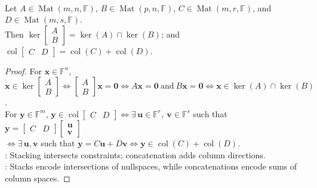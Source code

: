 \begin{proposition} \label{prop:stacked-nullspaces-and-concatenated-column-spaces} \\
Let $A\in\operatorname{Mat}(m,n,\mathbb{F})$, $B\in\operatorname{Mat}(p,n,\mathbb{F})$, $C\in\operatorname{Mat}(m,r,\mathbb{F})$, and $D\in\operatorname{Mat}(m,s,\mathbb{F})$.\\
Then $\ker\begin{bmatrix} A\\ B\end{bmatrix}=\ker(A)\cap\ker(B)$; and $\operatorname{col}\begin{bmatrix} C & D\end{bmatrix} =\operatorname{col}(C)+\operatorname{col}(D)$.
\begin{proof}
For $\mathbf{x}\in\mathbb{F}^n$, $\mathbf{x}\in\ker\begin{bmatrix}A\\ B\end{bmatrix} \iff \begin{bmatrix}A\\ B\end{bmatrix}\mathbf{x}=\mathbf{0} \iff A\mathbf{x}=\mathbf{0}\ \text{and}\ B\mathbf{x}=\mathbf{0} \iff \mathbf{x}\in\ker(A)\cap\ker(B)$.\\
For $\mathbf{y}\in\mathbb{F}^m$, $\mathbf{y}\in\operatorname{col}\begin{bmatrix}C&D\end{bmatrix} \iff \exists\,\mathbf{u}\in\mathbb{F}^r,\ \mathbf{v}\in\mathbb{F}^s$ such that $\mathbf{y}=\begin{bmatrix}C&D\end{bmatrix}\begin{bmatrix}\mathbf{u}\\ \mathbf{v}\end{bmatrix}$\\
$\iff \exists\,\mathbf{u},\mathbf{v}$ such that $\mathbf{y}=C\mathbf{u}+D\mathbf{v} \iff \mathbf{y}\in\operatorname{col}(C)+\operatorname{col}(D)$.\\
: Stacking intersects constraints; concatenation adds column directions.\\
: Stacks encode intersections of nullspaces, while concatenations encode sums of column spaces.
\end{proof}
\end{proposition}

